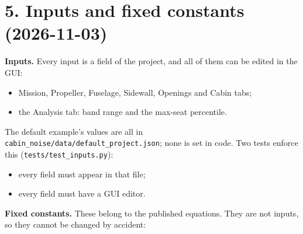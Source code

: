\documentclass[10pt,a4paper]{article}
\begin{document}
\section*{5. Inputs and fixed constants (2026-11-03)}

\textbf{Inputs.} Every input is a field of the project, and all of them can be edited in the GUI:

\begin{itemize}
\item Mission, Propeller, Fuselage, Sidewall, Openings and Cabin tabs;
\item the Analysis tab: band range and the max-seat percentile.
\end{itemize}

The default example's values are all in \texttt{cabin\_\allowbreak{}noise/\allowbreak{}data/\allowbreak{}default\_\allowbreak{}project.\allowbreak{}json}; none is set in code. Two tests enforce this (\texttt{tests/\allowbreak{}test\_\allowbreak{}inputs.\allowbreak{}py}):

\begin{itemize}
\item every field must appear in that file;
\item every field must have a GUI editor.
\end{itemize}

\textbf{Fixed constants.} These belong to the published equations. They are not inputs, so they cannot be changed by accident:
\end{document}
